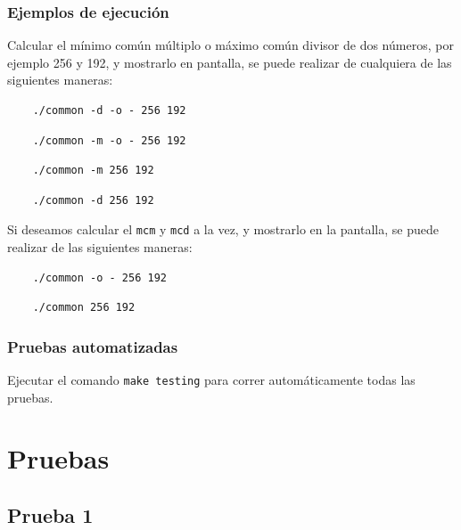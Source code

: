 \documentclass[titlepage,a4paper]{article}
\begin{document}
\subsubsection{Ejemplos de ejecución}

Calcular el mínimo común múltiplo o máximo común divisor de dos números, por ejemplo 256 y 192, y mostrarlo en pantalla, se puede realizar de cualquiera de las siguientes maneras:

\begin{verbatim}
    ./common -d -o - 256 192
\end{verbatim}

\begin{verbatim}
    ./common -m -o - 256 192
\end{verbatim}

\begin{verbatim}
    ./common -m 256 192
\end{verbatim}

\begin{verbatim}
    ./common -d 256 192
\end{verbatim}

Si deseamos calcular el \verb|mcm| y \verb|mcd| a la vez, y mostrarlo en la pantalla, se puede realizar de las siguientes maneras:

\begin{verbatim}
    ./common -o - 256 192
\end{verbatim}

\begin{verbatim}
    ./common 256 192
\end{verbatim}

\subsubsection{Pruebas automatizadas}

Ejecutar el comando \verb|make testing| para correr automáticamente todas las pruebas.

\section{Pruebas}

\subsection{Prueba 1}
\end{document}
